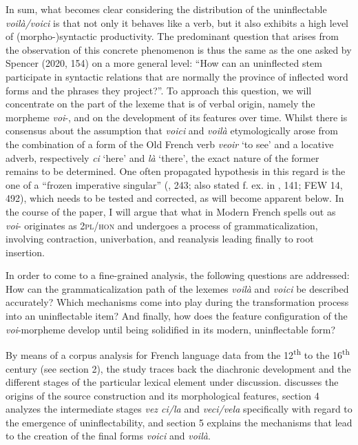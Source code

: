 \documentclass[output=paper]{langscibook}
\begin{document}
\begin{itemize}
\begin{itemize}
\begin{itemize}
\begin{itemize}
\begin{itemize}
\begin{itemize}
\begin{itemize}
In sum, what becomes clear considering the distribution of the uninflectable \textit{voilà/voici} is that not only it behaves like a verb, but it also exhibits a high level of (morpho-)syntactic productivity. The predominant question that arises from the observation of this concrete phenomenon is thus the same as the one asked by Spencer (2020, 154) on a more general level: “How can an uninflected stem participate in syntactic relations that are normally the province of inflected word forms and the phrases they project?”. To approach this question, we will concentrate on the part of the lexeme that is of verbal origin, namely the morpheme \textit{voi}{}-, and on the development of its features over time. Whilst there is consensus about the assumption that \textit{voici} and \textit{voilà} etymologically arose from the combination of a form of the Old French verb \textit{veoir} ‘to see’ and a locative adverb, respectively \textit{ci} ‘here’ and \textit{là} ‘there’, the exact nature of the former remains to be determined. One often propagated hypothesis in this regard is the one of a “frozen imperative singular” (\citealt{Burdiant2000}, 243; also stated f. ex. in \citealt{Rabatel2001}, 141; FEW 14, 492), which needs to be tested and corrected, as will become apparent below. In the course of the paper, I will argue that what in Modern French spells out as \textit{voi}{}- originates as \textsc{2pl/hon} and undergoes a process of grammaticalization, involving contraction, univerbation, and reanalysis leading finally to root insertion.

In order to come to a fine-grained analysis, the following questions are addressed: How can the grammaticalization path of the lexemes \textit{voilà} and \textit{voici} be described accurately? Which mechanisms come into play during the transformation process into an uninflectable item? And finally, how does the feature configuration of the \textit{voi}{}-morpheme develop until being solidified in its modern, uninflectable form?

By means of a corpus analysis for French language data from the 12\textsuperscript{th} to the 16\textsuperscript{th} century (see section 2), the study traces back the diachronic development and the different stages of the particular lexical element under discussion.  discusses the origins of the source construction and its morphological features, section 4 analyzes the intermediate stages \textit{vez ci/la} and \textit{veci/vela} specifically with regard to the emergence of uninflectability, and section 5 explains the mechanisms that lead to the creation of the final forms \textit{voici} and \textit{voilà}. 


\end{itemize}
\end{itemize}
\end{itemize}
\end{itemize}
\end{itemize}
\end{itemize}
\end{itemize}
\end{document}
